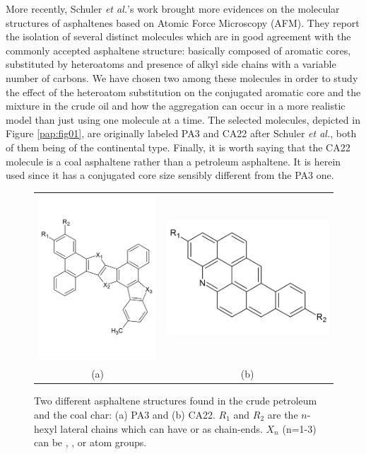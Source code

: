 More recently, Schuler \textit{et al.}'s\cite{schuler2015unraveling} work brought more evidences on the molecular structures of asphaltenes based on Atomic Force Microscopy (AFM). They report the isolation of several distinct molecules which are in good agreement with the commonly accepted asphaltene structure: basically composed of aromatic cores, substituted by heteroatoms and presence of alkyl side chains with a variable number of carbons. We have chosen two among these molecules in order to study the effect of the heteroatom substitution on the conjugated aromatic core and the mixture in the crude oil and how the aggregation can occur in a more realistic model than just using one molecule at a time. The selected molecules, depicted in Figure \ref{pap:fig01}, are originally labeled PA3 and CA22 after Schuler \textit{et al.},\cite{schuler2015unraveling} both of them being of the continental type.\cite{mullins2010modified,mullins2011asphaltenes,mullins2012advances} Finally, it is worth saying that the CA22 molecule is a coal asphaltene rather than a petroleum asphaltene. It is herein used since it has a conjugated core size sensibly different from the PA3 one.

\begin{figure}[htb]
	\centering
	\begin{tabular}{cc}
		\includegraphics[width=0.35\columnwidth]{image/PA3} &
		\includegraphics[width=0.35\columnwidth]{image/CA22}\\
		(a) & (b)\\
	\end{tabular}
	\caption{Two different asphaltene structures found in the crude petroleum and the coal char: (a) PA3 and (b) CA22. $R_1$ and $R_2$ are the $n$-hexyl lateral chains which can have  or  as chain-ends. $X_n$ (n=1-3) can be , , or  atom groups.}
	\label{pap:fig02}
\end{figure}

